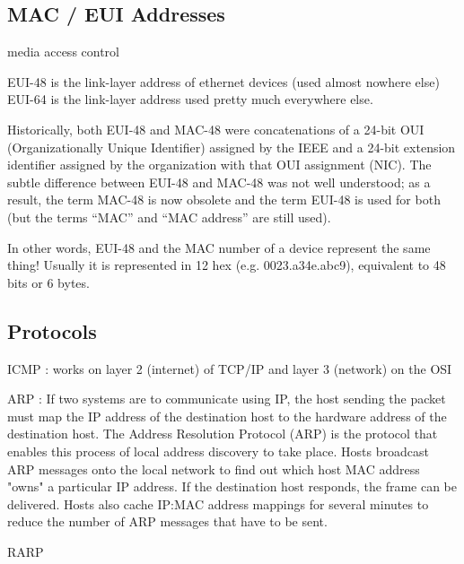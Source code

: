 

\subsectionend

\subsection{MAC / EUI Addresses}
\label{ssec:mac_eui_addresses}

media access control

EUI-48 is the link-layer address of ethernet devices (used almost nowhere else) EUI-64 is the link-layer address used pretty much everywhere else.

Historically, both EUI-48 and MAC-48 were concatenations of a 24-bit OUI
(Organizationally Unique Identifier) assigned by the IEEE and a 24-bit extension
identifier assigned by the organization with that OUI assignment (NIC). The
subtle difference between EUI-48 and MAC-48 was not well understood; as a
result, the term MAC-48 is now obsolete and the term EUI-48 is used for both
(but the terms “MAC” and “MAC address” are still used).

In other words, EUI-48 and the MAC number of a device represent the same thing!
Usually it is represented in 12 hex (e.g. 0023.a34e.abc9), equivalent to 48 bits
or 6 bytes.

\subsectionend

\subsection{Protocols}
\label{ssec:protocols}

ICMP : works on layer 2 (internet) of TCP/IP and layer 3 (network) on the OSI 


ARP : If two systems are to communicate using IP, the host sending the packet
must map the IP address of the destination host to the hardware address of the
destination host. The Address Resolution Protocol (ARP) is the protocol that
enables this process of local address discovery to take place. Hosts broadcast
ARP messages onto the local network to find out which host MAC address "owns" a
particular IP address. If the destination host responds, the frame can be
delivered. Hosts also cache IP:MAC address mappings for several minutes to
reduce the number of ARP messages that have to be sent. 

RARP



